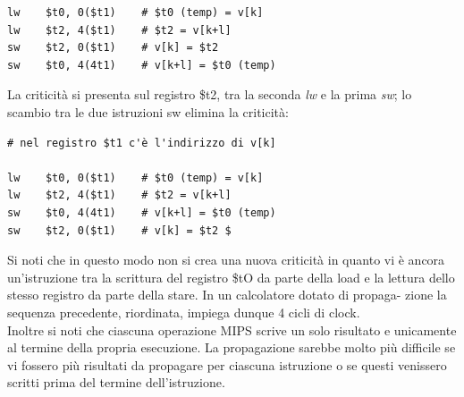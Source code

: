 \documentclass[a4paper,12pt, oneside]{book}
\begin{document}
\begin{enumerate}
\begin{verbatim}
lw    $t0, 0($t1)    # $t0 (temp) = v[k]
lw    $t2, 4($t1)    # $t2 = v[k+l]
sw    $t2, 0($t1)    # v[k] = $t2
sw    $t0, 4(4t1)    # v[k+l] = $t0 (temp)
\end{verbatim}
  La criticità si presenta sul registro \$t2, tra la seconda \textit{lw} e la prima \textit{sw}; lo scambio tra le due istruzioni sw elimina la criticità:
\begin{verbatim}
# nel registro $t1 c'è l'indirizzo di v[k]

lw    $t0, 0($t1)    # $t0 (temp) = v[k]
lw    $t2, 4($t1)    # $t2 = v[k+l]
sw    $t0, 4(4t1)    # v[k+l] = $t0 (temp)
sw    $t2, 0($t1)    # v[k] = $t2 $
\end{verbatim}
  Si noti che in questo modo non si crea una nuova criticità in quanto vi è ancora
  un'istruzione tra la scrittura del registro \$tO da parte della load e la lettura
  dello stesso registro da parte della stare. In un calcolatore dotato di propaga-
  zione la sequenza precedente, riordinata, impiega dunque 4 cicli di clock.\\
  Inoltre si noti che ciascuna operazione MIPS scrive un solo risultato e unicamente al termine della propria esecuzione. La propagazione sarebbe molto più difficile se vi fossero più risultati da propagare per ciascuna istruzione o se questi venissero scritti prima del termine dell'istruzione.
\end{enumerate}
\end{document}
